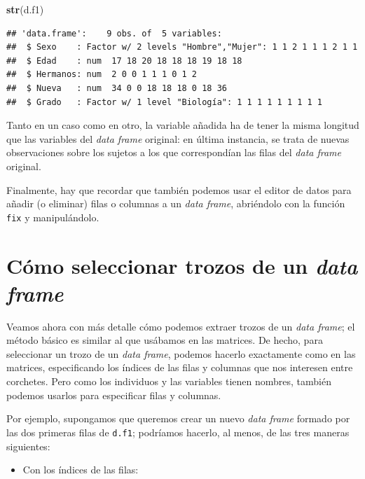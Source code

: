 \documentclass[]{book}
\newenvironment{Shaded}{\begin{snugshade}}{\end{snugshade}}
\newcommand{\KeywordTok}[1]{\textcolor[rgb]{0.13,0.29,0.53}{\textbf{#1}}}
\newcommand{\NormalTok}[1]{#1}
\providecommand{\tightlist}{%
  \setlength{\itemsep}{0pt}\setlength{\parskip}{0pt}}
\theoremstyle{definition}
\theoremstyle{definition}
\theoremstyle{definition}
\theoremstyle{remark}
\begin{document}
\begin{Shaded}
\begin{Highlighting}[]
\KeywordTok{str}\NormalTok{(d.f1)}
\end{Highlighting}
\end{Shaded}

\begin{verbatim}
## 'data.frame':    9 obs. of  5 variables:
##  $ Sexo    : Factor w/ 2 levels "Hombre","Mujer": 1 1 2 1 1 1 2 1 1
##  $ Edad    : num  17 18 20 18 18 18 19 18 18
##  $ Hermanos: num  2 0 0 1 1 1 0 1 2
##  $ Nueva   : num  34 0 0 18 18 18 0 18 36
##  $ Grado   : Factor w/ 1 level "Biología": 1 1 1 1 1 1 1 1 1
\end{verbatim}

Tanto en un caso como en otro, la variable añadida ha de tener la misma longitud que las variables del \emph{data frame} original: en última instancia, se trata de nuevas observaciones sobre los sujetos a los que correspondían las filas del \emph{data frame} original.

Finalmente, hay que recordar que también podemos usar el editor de datos para añadir (o eliminar) filas o columnas a un \emph{data frame}, abriéndolo con la función \texttt{fix} y manipulándolo.

\hypertarget{como-seleccionar-trozos-de-un-data-frame}{%
\section{\texorpdfstring{Cómo seleccionar trozos de un \emph{data frame}}{Cómo seleccionar trozos de un data frame}}\label{como-seleccionar-trozos-de-un-data-frame}}

Veamos ahora con más detalle cómo podemos extraer trozos de un \emph{data frame}; el método básico es similar al que usábamos en las matrices. De hecho, para seleccionar un trozo de un \emph{data frame}, podemos hacerlo exactamente como en las matrices, especificando los índices de las filas y columnas que nos interesen entre corchetes. Pero como los individuos y las variables tienen nombres, también podemos usarlos para especificar filas y columnas.

Por ejemplo, supongamos que queremos crear un nuevo \emph{data frame} formado por las dos primeras filas de \texttt{d.f1}; podríamos hacerlo, al menos, de las tres maneras siguientes:

\begin{itemize}
\tightlist
\item
  Con los índices de las filas:
\end{itemize}
\end{document}
